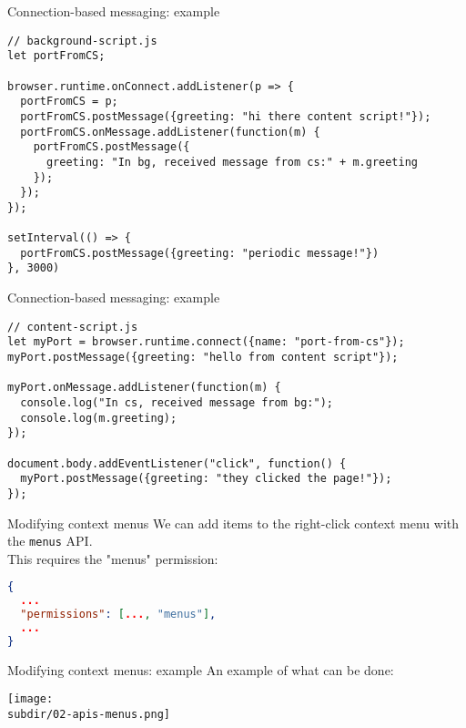 \documentclass[../index.tex]{subfiles}
\begin{document}
\renewcommand{\currenttitle}{Connection-based messaging: example}
\begin{frame}[fragile]{\currenttitle}
  \begin{lstlisting}[language=ES6]
// background-script.js
let portFromCS;

browser.runtime.onConnect.addListener(p => {
  portFromCS = p;
  portFromCS.postMessage({greeting: "hi there content script!"});
  portFromCS.onMessage.addListener(function(m) {
    portFromCS.postMessage({
      greeting: "In bg, received message from cs:" + m.greeting
    });
  });
});

setInterval(() => {
  portFromCS.postMessage({greeting: "periodic message!"})
}, 3000)
  \end{lstlisting}
\end{frame}

\begin{frame}[fragile]{\currenttitle}
  \begin{lstlisting}[language=ES6]
// content-script.js
let myPort = browser.runtime.connect({name: "port-from-cs"});
myPort.postMessage({greeting: "hello from content script"});

myPort.onMessage.addListener(function(m) {
  console.log("In cs, received message from bg:");
  console.log(m.greeting);
});

document.body.addEventListener("click", function() {
  myPort.postMessage({greeting: "they clicked the page!"});
});
  \end{lstlisting}
\end{frame}

\renewcommand{\currenttitle}{Modifying context menus}
\begin{frame}[fragile]{\currenttitle}
  We can add items to the right-click context menu with the \texttt{menus} API.
  \\[1em]

  This requires the "menus" permission:
  \begin{lstlisting}[language=json]
{
  ...
  "permissions": [..., "menus"],
  ...
}
  \end{lstlisting}
\end{frame}

\renewcommand{\currenttitle}{Modifying context menus: example}
\begin{frame}[fragile]{\currenttitle}
  An example of what can be done: \\[2em]

  \begin{center}
    \texttt{[image: \\subdir/02-apis-menus.png]}
  \end{center}
\end{frame}
\end{document}
